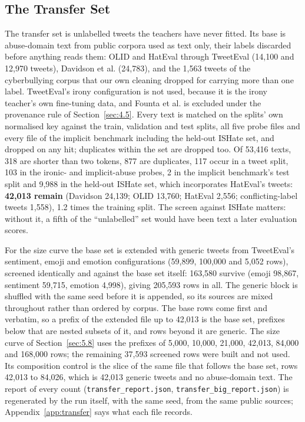 \subsection{The Transfer Set}
\label{sec:4.4}
The transfer set is unlabelled tweets the teachers have never fitted. Its base is abuse-domain text
from public corpora used as text only, their labels discarded before anything reads them: OLID
\cite{zampieri2019olid} and HatEval \cite{basile2019hateval} through TweetEval
\cite{barbieri2020tweeteval} (14,100 and 12,970 tweets), Davidson et al.
\cite{davidson2017automated} (24,783), and the 1,563 tweets of the cyberbullying corpus that our own
cleaning dropped for carrying more than one label. TweetEval's irony configuration is not used,
because it is the irony teacher's own fine-tuning data, and Founta et al. \cite{founta2018large} is
excluded under the provenance rule of Section~\ref{sec:4.5}. Every text is matched on the splits'
own normalised key against the train, validation and test splits, all five probe files and every
file of the implicit benchmark including the held-out ISHate set, and dropped on any hit; duplicates
within the set are dropped too. Of 53,416 texts, 318 are shorter than two tokens, 877 are
duplicates, 117 occur in a tweet split, 103 in the ironic- and implicit-abuse probes, 2 in the
implicit benchmark's test split and 9,988 in the held-out ISHate set, which incorporates HatEval's
tweets: \textbf{42,013 remain} (Davidson 24,139; OLID 13,760; HatEval 2,556; conflicting-label
tweets 1,558), 1.2 times the training split. The screen against ISHate matters: without it, a fifth
of the ``unlabelled'' set would have been text a later evaluation scores.

For the size curve the base set is extended with generic tweets from TweetEval's sentiment, emoji
and emotion configurations (59,899, 100,000 and 5,052 rows), screened identically and against the
base set itself: 163,580 survive (emoji 98,867, sentiment 59,715, emotion 4,998), giving 205,593
rows in all. The generic block is shuffled with the same seed before it is appended, so its sources
are mixed throughout rather than ordered by corpus. The base rows come first and verbatim, so a
prefix of the extended file up to 42,013 is the base set, prefixes below that are nested subsets of
it, and rows beyond it are generic. The size curve of Section~\ref{sec:5.8} uses the prefixes of
5,000, 10,000, 21,000, 42,013, 84,000 and 168,000 rows; the remaining 37,593 screened rows were
built and not used. Its composition control is the slice of the same file that follows the base set,
rows 42,013 to 84,026, which is 42,013 generic tweets and no abuse-domain text. The report of every
count (\texttt{transfer\_report.json}, \texttt{transfer\_big\_report.json}) is regenerated by the
run itself, with the same seed, from the same public sources; Appendix~\ref{app:transfer} says what
each file records.

